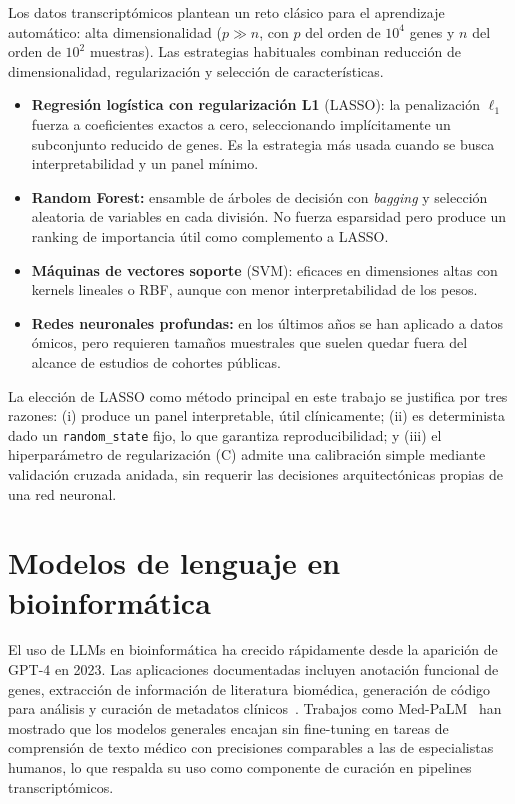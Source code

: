 Los datos transcriptómicos plantean un reto clásico para el aprendizaje
automático: alta dimensionalidad ($p \gg n$, con $p$ del orden de $10^4$
genes y $n$ del orden de $10^2$ muestras). Las estrategias habituales
combinan reducción de dimensionalidad, regularización y selección de
características.

\begin{itemize}
  \item \textbf{Regresión logística con regularización L1} (LASSO): la
  penalización $\ell_1$ fuerza a coeficientes exactos a cero, seleccionando
  implícitamente un subconjunto reducido de genes. Es la estrategia más
  usada cuando se busca interpretabilidad y un panel mínimo.
  \item \textbf{Random Forest:} ensamble de árboles de decisión con
  \emph{bagging} y selección aleatoria de variables en cada división. No
  fuerza esparsidad pero produce un ranking de importancia útil como
  complemento a LASSO.
  \item \textbf{Máquinas de vectores soporte} (SVM): eficaces en
  dimensiones altas con kernels lineales o RBF, aunque con menor
  interpretabilidad de los pesos.
  \item \textbf{Redes neuronales profundas:} en los últimos años se han
  aplicado a datos ómicos, pero requieren tamaños muestrales que suelen
  quedar fuera del alcance de estudios de cohortes públicas.
\end{itemize}

La elección de LASSO como método principal en este trabajo se justifica por
tres razones: (i) produce un panel interpretable, útil clínicamente;
(ii) es determinista dado un \texttt{random\_state} fijo, lo que garantiza
reproducibilidad; y (iii) el hiperparámetro de regularización (C) admite
una calibración simple mediante validación cruzada anidada, sin requerir
las decisiones arquitectónicas propias de una red neuronal.

\section{Modelos de lenguaje en bioinformática}
\label{sec:llm_estado}

El uso de LLMs en bioinformática ha crecido rápidamente desde la aparición
de GPT-4 en 2023. Las aplicaciones documentadas incluyen anotación
funcional de genes, extracción de información de literatura biomédica,
generación de código para análisis y curación de metadatos
clínicos~\cite{tinn2023bioclinicalbert, thirunavukarasu2023llm}. Trabajos
como Med-PaLM~\cite{singhal2023medpalm} han mostrado que los modelos
generales encajan sin fine-tuning en tareas de comprensión de texto médico
con precisiones comparables a las de especialistas humanos, lo que
respalda su uso como componente de curación en pipelines
transcriptómicos.

